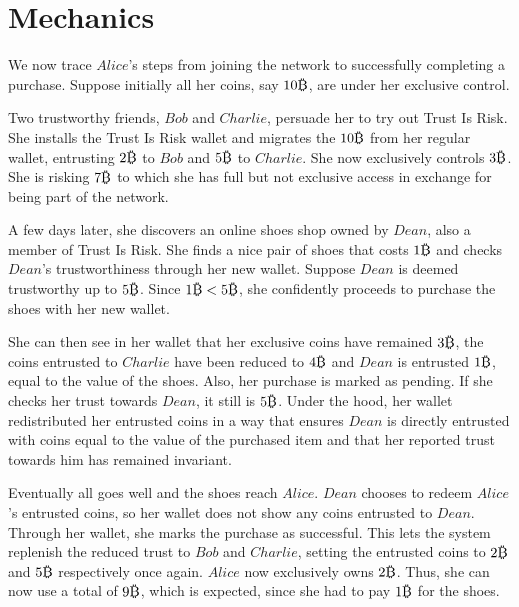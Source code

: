 \section{Mechanics}
  We now trace $Alice$'s steps from joining the network to successfully completing a purchase. Suppose initially all her
  coins, say $10\bitcoin$, are under her exclusive control.

  Two trustworthy friends, $Bob$ and $Charlie$, persuade her to try out Trust Is Risk. She installs the Trust Is Risk wallet
  and migrates the $10\bitcoin$ from her regular wallet, entrusting $2\bitcoin$ to $Bob$ and $5\bitcoin$ to $Charlie$. She now
  exclusively controls $3\bitcoin$. She is risking $7\bitcoin$ to which she has full but not exclusive access in exchange for
  being part of the network.

  A few days later, she discovers an online shoes shop owned by $Dean$, also a member of Trust Is Risk. She finds a nice pair
  of shoes that costs $1\bitcoin$ and checks $Dean$'s trustworthiness through her new wallet. Suppose $Dean$ is deemed
  trustworthy up to $5\bitcoin$. Since $1\bitcoin < 5\bitcoin$, she confidently proceeds to purchase the shoes with her new
  wallet.

  She can then see in her wallet that her exclusive coins have remained $3\bitcoin$, the coins entrusted to $Charlie$ have
  been reduced to $4\bitcoin$ and $Dean$ is entrusted $1\bitcoin$, equal to the value of the shoes. Also, her purchase is
  marked as pending. If she checks her trust towards $Dean$, it still is $5\bitcoin$. Under the hood, her wallet redistributed
  her entrusted coins in a way that ensures $Dean$ is directly entrusted with coins equal to the value of the purchased item
  and that her reported trust towards him has remained invariant.

  Eventually all goes well and the shoes reach $Alice$. $Dean$ chooses to redeem $Alice$'s entrusted coins, so her wallet
  does not show any coins entrusted to $Dean$. Through her wallet, she marks the purchase as successful. This lets the system
  replenish the reduced trust to $Bob$ and $Charlie$, setting the entrusted coins to $2\bitcoin$ and $5\bitcoin$ respectively
  once again. $Alice$ now exclusively owns $2\bitcoin$. Thus, she can now use a total of $9\bitcoin$, which is expected,
  since she had to pay $1\bitcoin$ for the shoes.
